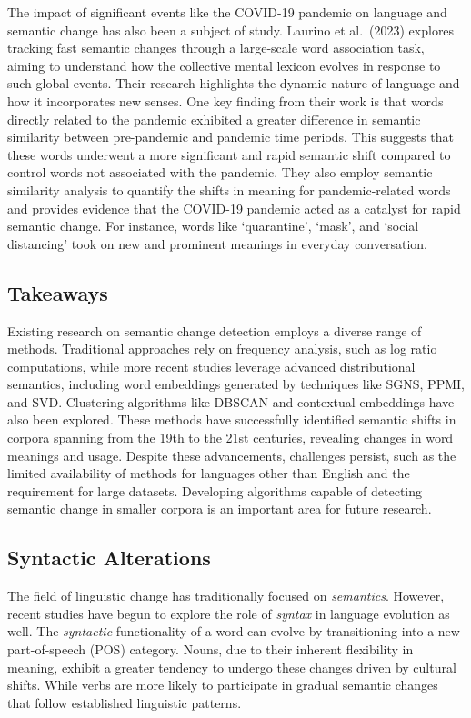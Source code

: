 The impact of significant events like the COVID-19 pandemic on language and semantic change has also been a subject of study.
Laurino et al.\ (2023) explores tracking fast semantic changes through a large-scale word association task, aiming to understand how the collective mental lexicon evolves in response to such global events.
Their research highlights the dynamic nature of language and how it incorporates new senses.
One key finding from their work is that words directly related to the pandemic exhibited a greater difference in semantic similarity between pre-pandemic and pandemic time periods.
This suggests that these words underwent a more significant and rapid semantic shift compared to control words not associated with the pandemic.
They also employ semantic similarity analysis to quantify the shifts in meaning for pandemic-related words and provides evidence that the COVID-19 pandemic acted as a catalyst for rapid semantic change.
For instance, words like `quarantine', `mask', and `social distancing' took on new and prominent meanings in everyday conversation.

\subsection{Takeaways}\label{subsec:semantic-takeaways}
Existing research on semantic change detection employs a diverse range of methods.
Traditional approaches rely on frequency analysis, such as log ratio computations, while more recent studies leverage advanced distributional semantics, including word embeddings generated by techniques like SGNS, PPMI, and SVD.
Clustering algorithms like DBSCAN and contextual embeddings have also been explored.
These methods have successfully identified semantic shifts in corpora spanning from the 19th to the 21st centuries, revealing changes in word meanings and usage.
Despite these advancements, challenges persist, such as the limited availability of methods for languages other than English and the requirement for large datasets.
Developing algorithms capable of detecting semantic change in smaller corpora is an important area for future research.

\subsection{Syntactic Alterations} \label{subsec:syntactic-alterations}
The field of linguistic change has traditionally focused on \emph{semantics}.
However, recent studies have begun to explore the role of \emph{syntax} in language evolution as well.
The \emph{syntactic} functionality of a word can evolve by transitioning into a new part-of-speech (POS) category.
Nouns, due to their inherent flexibility in meaning, exhibit a greater tendency to undergo these changes driven by cultural shifts.
While verbs are more likely to participate in gradual semantic changes that follow established linguistic patterns. \cite{hamilton-etal-2016-cultural, hamilton-etal-2016-diachronic}

